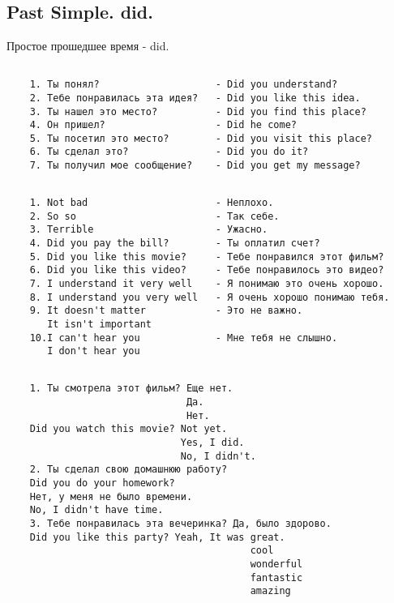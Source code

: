 \subsection{Past Simple. did.}
Простое прошедшее время - did.
\subsection*{}
\begin{verbatim}
    1. Ты понял?                    - Did you understand?
    2. Тебе понравилась эта идея?   - Did you like this idea.
    3. Ты нашел это место?          - Did you find this place?
    4. Он пришел?                   - Did he come?
    5. Ты посетил это место?        - Did you visit this place?
    6. Ты сделал это?               - Did you do it?
    7. Ты получил мое сообщение?    - Did you get my message?
\end{verbatim}

\subsection*{}
\begin{verbatim}
    1. Not bad                      - Неплохо.
    2. So so                        - Так себе.
    3. Terrible                     - Ужасно.
    4. Did you pay the bill?        - Ты оплатил счет?
    5. Did you like this movie?     - Тебе понравился этот фильм?
    6. Did you like this video?     - Тебе понравилось это видео?
    7. I understand it very well    - Я понимаю это очень хорошо.
    8. I understand you very well   - Я очень хорошо понимаю тебя.
    9. It doesn't matter            - Это не важно.
       It isn't important
    10.I can't hear you             - Мне тебя не слышно.
       I don't hear you
\end{verbatim}

\subsection*{}
\begin{verbatim}
    1. Ты смотрела этот фильм? Еще нет.
                               Да.
                               Нет.
    Did you watch this movie? Not yet.
                              Yes, I did.
                              No, I didn't.
    2. Ты сделал свою домашнюю работу?
    Did you do your homework?
    Нет, у меня не было времени.
    No, I didn't have time.
    3. Тебе понравилась эта вечеринка? Да, было здорово.
    Did you like this party? Yeah, It was great.
                                          cool
                                          wonderful
                                          fantastic
                                          amazing
\end{verbatim}

